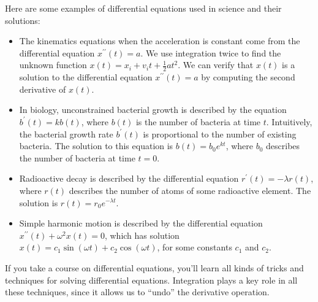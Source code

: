 			Here are some examples of differential equations used in science
			and their solutions:

			\begin{itemize}

				\item	The kinematics equations when the acceleration is constant
					come from the differential equation $x^{\prime\prime\!}(t) = a$.
					We use integration twice to find the unknown function
					$x(t) = x_i + v_it + \tfrac{1}{2}at^2$.
					We can verify that $x(t)$ is a solution to the differential equation $x^{\prime\prime\!}(t) = a$
					by computing the second derivative of $x(t)$.

				\vspace{2mm}	%

				\item In biology,
					unconstrained bacterial growth is described by the equation $b^{\prime\!}(t) = kb(t)$,
					where $b(t)$ is the number of bacteria at time $t$.
					Intuitively,
					the bacterial growth rate $b^{\prime\!}(t)$
					is proportional to the number of existing bacteria.
					The solution to this equation is $b(t) = b_0e^{k t}$,
					where $b_0$ describes the number of bacteria at time $t = 0$.

				\vspace{2mm}	%

				\item Radioactive decay is described by the differential equation
					$r^{\prime\!}(t) = -\lambda r(t)$,
					where $r(t)$ describes the number of atoms of some radioactive element.
					The solution is $r(t) = r_0e^{-\lambda t}$.

				\vspace{2mm}	%

				\item Simple harmonic motion is described by the
					differential equation $x^{\prime\prime\!}(t) + \omega^2 x(t) = 0$,
					which has solution $x(t) = c_1 \sin(\omega t) + c_2 \cos(\omega t)$,
					for some constants $c_1$ and $c_2$.

			\end{itemize}

			\noindent
			If you take a course on differential equations,
			you'll learn all kinds of tricks and techniques for solving differential equations.
			Integration plays a key role in all these techniques,
			since it allows us to ``undo'' the derivative operation.			

